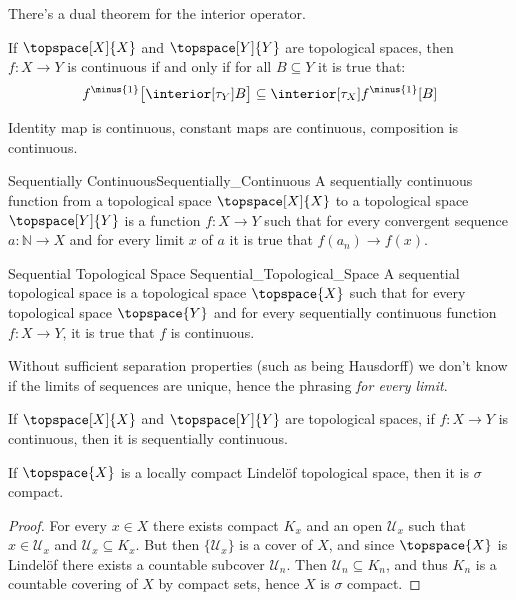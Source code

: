     There's a dual theorem for the interior operator.
    \begin{theorem}
        If $\topspace[X]{X}$ and $\topspace[Y]{Y}$ are topological spaces,
        then $f:X\rightarrow{Y}$ is continuous if and only if for all
        $B\subseteq{Y}$ it is true that:
        \begin{equation}
            f^{\minus{1}}\big[\interior[\tau_{Y}]{B}\big]
            \subseteq\interior[\tau_{X}]{f^{\minus{1}}[B]}
        \end{equation}
    \end{theorem}
    Identity map is continuous, constant maps are continuous, composition is
    continuous.
    \begin{fdefinition}{Sequentially Continuous}{Sequentially_Continuous}
        A sequentially continuous function from a topological space
        $\topspace[X]{X}$ to a topological space $\topspace[Y]{Y}$ is a
        function $f:X\rightarrow{Y}$ such that for every convergent sequence
        $a:\mathbb{N}\rightarrow{X}$ and for every limit $x$ of $a$ it is
        true that $f(a_{n})\rightarrow{f}(x)$.
    \end{fdefinition}
    \begin{fdefinition}{Sequential Topological Space}
                       {Sequential_Topological_Space}
        A sequential topological space is a topological space $\topspace{X}$
        such that for every topological space $\topspace{Y}$ and for every
        sequentially continuous function $f:X\rightarrow{Y}$, it is true
        that $f$ is continuous.
    \end{fdefinition}
    Without sufficient separation properties (such as being Hausdorff) we
    don't know if the limits of sequences are unique, hence the phrasing
    \textit{for every limit}.
    \begin{theorem}
        If $\topspace[X]{X}$ and $\topspace[Y]{Y}$ are topological spaces,
        if $f:X\rightarrow{Y}$ is continuous, then it is sequentially
        continuous.
    \end{theorem}
    \begin{theorem}
        If $\topspace{X}$ is a locally compact Lindel\"{o}f topological
        space, then it is $\sigma$ compact.
    \end{theorem}
    \begin{proof}
        For every $x\in{X}$ there exists compact $K_{x}$ and an open
        $\mathcal{U}_{x}$ such that $x\in\mathcal{U}_{x}$ and
        $\mathcal{U}_{x}\subseteq{K}_{x}$. But then $\{\mathcal{U}_{x}\}$ is
        a cover of $X$, and since $\topspace{X}$ is Lindel\"{o}f there
        exists a countable subcover $\mathcal{U}_{n}$. Then
        $\mathcal{U}_{n}\subseteq{K}_{n}$, and thus $K_{n}$ is a countable
        covering of $X$ by compact sets, hence $X$ is $\sigma$ compact.
    \end{proof}
